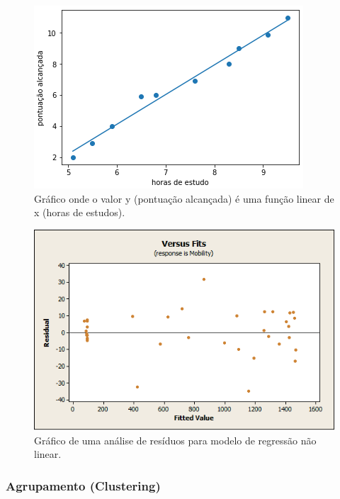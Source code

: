 \begin{figure}[!htp]
	\begin{center}
    \caption{\label{fig:waveform_fig} Gráfico onde o valor y (pontuação alcançada) é uma função linear de x (horas de estudos).}
	\includegraphics[scale=0.99]{Figuras/Regressao_linear.png}
	\end{center}
\end{figure}

\begin{figure}[!htp]
	\begin{center}
    \caption{\label{fig:waveform_fig} Gráfico de uma análise de resíduos para modelo de regressão não linear.}
	\includegraphics[scale=0.80]{Figuras/Regressao_nao_linear.png}
	\end{center}
\end{figure}

\subsubsection{Agrupamento (Clustering)}

